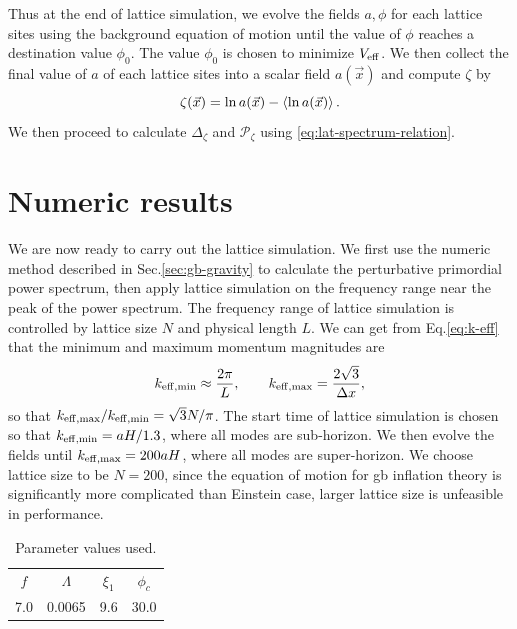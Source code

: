 \documentclass[reprint, 10pt, amsmath, amssymb, floatfix, aps, prd, superscriptaddress, nofootinbib, nobibnotes,twocolumn]{revtex4-1}
\begin{document}
Thus at the end of lattice simulation, we evolve the fields $a, \phi$ for each lattice sites using the background equation of motion until the value of $\phi$ reaches a destination value $\phi_0$. The value $\phi_0$ is chosen to minimize $V_{\rm eff}$. We then collect the final value of $a$ of each lattice sites into a scalar field $a(\vec x)$ and compute $\zeta$ by
\begin{equation}
	\zeta(\vec x) = \ln a(\vec x) - \braket{\ln a(\vec x)}.
\end{equation}
We then proceed to calculate $\Delta_\zeta$ and $\mathcal P_\zeta$ using \eqref{eq:lat-spectrum-relation}.

\section{Numeric results}
\label{sec:results}
We are now ready to carry out the lattice simulation. We first use the numeric method described in Sec.\ref{sec:gb-gravity} to calculate the perturbative primordial power spectrum, then apply lattice simulation on the frequency range near the peak of the power spectrum. The frequency range of lattice simulation is controlled by lattice size $N$ and physical length $L$. We can get from Eq.\eqref{eq:k-eff} that the minimum and maximum momentum magnitudes are
\begin{equation}
	k_{\rm eff,min} \approx \frac{2\pi}{L}, \qquad k_{\rm eff,max} = \frac{2\sqrt3}{\Delta x},
\end{equation}
so that $k_{\rm eff,max} / k_{\rm eff,min} = \sqrt3 N / \pi$. The start time of lattice simulation is chosen so that $k_{\rm eff,min} = aH / 1.3$, where all modes are sub-horizon. We then evolve the fields until $k_{\rm eff,max} = 200 aH$, where all modes are super-horizon. We choose lattice size to be $N = 200$, since the equation of motion for \ac{gb} inflation theory is significantly more complicated than Einstein case, larger lattice size is unfeasible in performance.

\begin{table}
    \caption{\label{tab:lat-sim-params}Parameter values used.}
	\begin{tabular}{cccc}
	    \hline
		$f$ & $\Lambda$ & $\xi_1$ & $\phi_c$ \\
		7.0 & 0.0065 & 9.6 & 30.0\\
		\hline
	\end{tabular}
\end{table}
\end{document}
